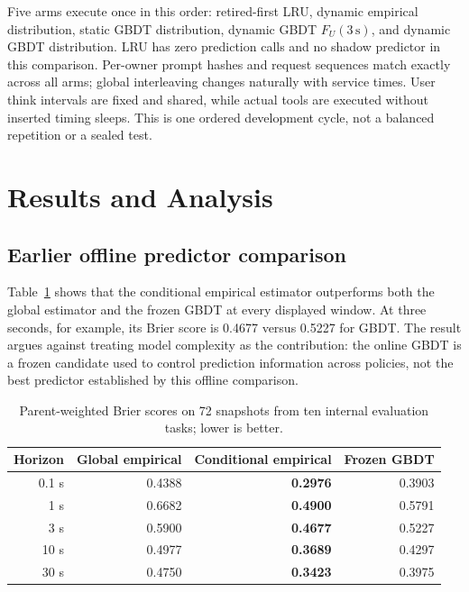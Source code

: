 \documentclass[sigconf, screen, review, balance=false]{acmart}
\def\endhead{}
\def\endlastfoot{}
\begin{document}
Five arms execute once in this order: retired-first LRU, dynamic
empirical distribution, static GBDT distribution, dynamic GBDT
\(F_U(3\,\mathrm{s})\), and dynamic GBDT distribution. LRU has zero
prediction calls and no shadow predictor in this comparison. Per-owner
prompt hashes and request sequences match exactly across all arms;
global interleaving changes naturally with service times. User think
intervals are fixed and shared, while actual tools are executed without
inserted timing sleeps. This is one ordered development cycle, not a
balanced repetition or a sealed test.


\section{Results and Analysis}\label{results-and-analysis}

\subsection{Earlier offline predictor comparison}\label{conditional-empirical-prediction-is-stronger-on-current-data}

Table~\ref{tab:old-prediction} shows that the conditional empirical estimator outperforms both
the global estimator and the frozen GBDT at every displayed window. At
three seconds, for example, its Brier score is 0.4677 versus 0.5227 for
GBDT. The result argues against treating model complexity as the
contribution: the online GBDT is a frozen candidate used to control
prediction information across policies, not the best predictor
established by this offline comparison.

\begin{table}[t]
\centering\small
\begin{tabular}{@{}rrrr@{}}
\toprule\noalign{}
Horizon & Global empirical & Conditional empirical & Frozen GBDT \\
\midrule\noalign{}
\endhead
\bottomrule\noalign{}
\endlastfoot
0.1 s & 0.4388 & \textbf{0.2976} & 0.3903 \\
1 s & 0.6682 & \textbf{0.4900} & 0.5791 \\
3 s & 0.5900 & \textbf{0.4677} & 0.5227 \\
10 s & 0.4977 & \textbf{0.3689} & 0.4297 \\
30 s & 0.4750 & \textbf{0.3423} & 0.3975 \\
\end{tabular}
\caption{Parent-weighted Brier scores on 72 snapshots from ten internal evaluation tasks; lower is better.}
\label{tab:old-prediction}
\end{table}
\end{document}
